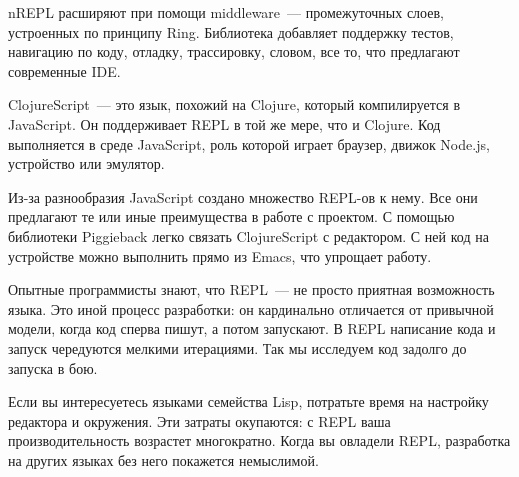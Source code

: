 nREPL расширяют при помощи middleware~--- промежуточных слоев, устроенных по принципу Ring. Библиотека  добавляет поддержку тестов, навигацию по коду, отладку, трассировку, словом, все то, что предлагают современные IDE.

ClojureScript~--- это язык, похожий на Clojure, который компилируется в JavaScript. Он поддерживает REPL в той же мере, что и Clojure. Код выполняется в среде JavaScript, роль которой играет браузер, движок Node.js, устройство или эмулятор.

Из-за разнообразия JavaScript создано множество REPL-ов к нему. Все они предлагают те или иные преимущества в работе с проектом. С помощью библиотеки Piggieback легко связать ClojureScript с редактором. С ней код на устройстве можно выполнить прямо из Emacs, что упрощает работу.

\begin{framed}

Опытные программисты знают, что REPL~--- не просто приятная возможность языка. Это иной процесс разработки: он кардинально отличается от привычной модели, когда код сперва пишут, а потом запускают. В REPL написание кода и запуск чередуются мелкими итерациями. Так мы исследуем код задолго до запуска в бою.

Если вы интересуетесь языками семейства Lisp, потратьте время на настройку редактора и окружения. Эти затраты окупаются: с REPL ваша производительность возрастет многократно. Когда вы овладели REPL, разработка на других языках без него покажется немыслимой.

\end{framed}
